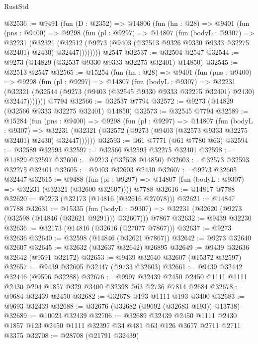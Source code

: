 \begin{lexlean}{RustStd}
\begin{coremodule}
@32536 := @9491
    (fun (D : @2352) =>
    @14806
      (fun (hn : @28) =>
      @9401
        (fun (pns : @9400) =>
        @9298
          (fun (pl : @9297) =>
          @14807
            (fun (bodyL : @9307) =>
            @32231
              (@32321
                (@32512 (@9273 (@9403 (@32513 @9326 @9330 @9333 @32275 @32401) @2430) @32447))))))))
    @2547
@32537 := @32504 @2547
@32544 := @9273 (@14829 (@32537 @9330 @9333 @32275 @32401) @14850)
@32545 := @32513 @2547
@32565 := @15254
    (fun (hn : @28) =>
    @9401
      (fun (pns : @9400) =>
      @9298
        (fun (pl : @9297) =>
        @14807
          (fun (bodyL : @9307) =>
          @32231
            (@32321 (@32544 (@9273 (@9403 (@32545 @9330 @9333 @32275 @32401) @2430) @32447)))))))
    @7794
@32566 := @32537 @7794
@32572 := @9273 (@14829 (@32566 @9333 @32275 @32401) @14850)
@32573 := @32545 @7794
@32589 := @15284
    (fun (pns : @9400) =>
    @9298
      (fun (pl : @9297) =>
      @14807
        (fun (bodyL : @9307) =>
        @32231 (@32321 (@32572 (@9273 (@9403 (@32573 @9333 @32275 @32401) @2430) @32447))))))
@32593 := @61 @7771 (@61 @7780 @63)
@32594 := @32589 @32593
@32597 := @32566 @32593 @32275 @32401
@32598 := @14829 @32597
@32600 := @9273 (@32598 @14850)
@32603 := @32573 @32593 @32275 @32401
@32605 := @9403 @32603 @2430
@32607 := @9273 @32605 @32447
@32615 := @9488
    (fun (pl : @9297) => @14807 (fun (bodyL : @9307) => @32231 (@32321 (@32600 @32607))))
    @7788
@32616 := @14817 @7788
@32620 := @9273 (@32173 (@14816 (@32616 @27078)))
@32621 := @14847 @7788
@32631 := @15335
    (fun (bodyL : @9307) => @32231 (@32620 (@9273 (@32598 (@14846 (@32621 @9291))) @32607)))
    @7867
@32632 := @9439 @32230
@32636 := @32173 (@14816 (@32616 (@27077 @7867)))
@32637 := @9273 @32636
@32640 := @32598 (@14846 (@32621 @7867))
@32642 := @9273 @32640 @32607
@32645 := @32632 (@32637 @32642) @26895
@32649 := @9439 @32636 @32642 (@9591 @32172)
@32653 := @9439 @32640 @32607 (@15372 @32597)
@32657 := @9439 @32605 @32447 (@9733 @32603)
@32661 := @9439 @32442 @32446 (@9596 @32288)
@32676 := @9997
    @32439
    @2450
    @2450
    @1111
    @1111
    @2430
    @204
    @1857
    @329
    @3400
    @32398
    @63
    @2736
    @7814
    @2684
@32678 := @9684 @32439 @2450
@32682 := @32678 @193 @1111 @193 @3400
@32683 := @9693 @32439
@32688 := @32676 (@32682 (@9692 (@32683 @193)) @13738)
@32689 := @10023 @32439
@32706 := @32689
    @32439
    @2450
    @1111
    @2430
    @1857
    @123
    @2450
    @1111
    @32397
    @34
    @481
    @63
    @126
    @3677
    @2711
    @2711
    @3375
@32708 := @28708 (@21791 @32439)

\end{coremodule}
\end{lexlean}
